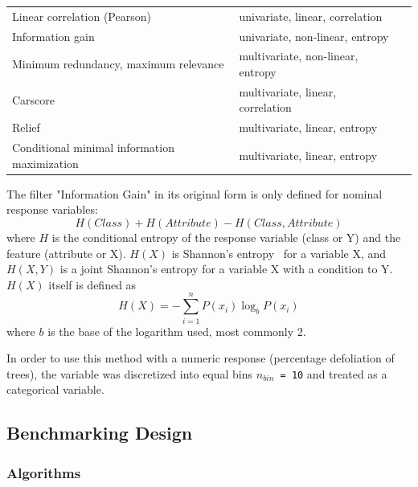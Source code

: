 \documentclass[remotesensing,article,accept,moreauthors,pdftex]{Definitions/mdpi}
\begin{document}
\begin{paracol}{2}
\begin{specialtable}[H]
\begin{tabular}{lll}
			Linear correlation (Pearson)                 & univariate, linear, correlation   &~\cite{pearson1901} \\
			Information gain                             & univariate, non-linear, entropy   &~\cite{quinlan1986} \\
			Minimum redundancy, maximum relevance        & multivariate, non-linear, entropy &~\cite{zhao2013}    \\
			Carscore                                     & multivariate, linear, correlation &~\cite{zuber2011}   \\
			Relief                                       & multivariate, linear, entropy     &~\cite{kira1992}    \\
			Conditional minimal information maximization & multivariate, linear, entropy     &~\cite{fleuret2004}\\\bottomrule
		\end{tabular}
	\endgroup
\end{specialtable}

The filter "Information Gain" in its original form is only defined for nominal response variables:
\begin{equation}
	H(Class) + H(Attribute) - H(Class, Attribute)
\end{equation}
where \(H\) is the conditional entropy of the response variable (class or Y) and the feature (attribute or X).
$H(X)$ is Shannon's entropy~\cite{shannon1948} for a variable X, and $H(X, Y)$ is a joint Shannon's entropy for a variable X with a condition to Y.
$H(X)$ itself is defined as
\begin{equation}
	H(X) = - \sum_{i=1}^{n} P(x_i)\log_bP(x_i)
\end{equation}
where $b$ is the base of the logarithm used, most commonly 2.

In order to use this method with a numeric response (percentage defoliation of trees), the variable was discretized into equal bins \texttt{\(n_{bin}\) = 10} and treated as a categorical variable.

\subsection{Benchmarking Design}

\subsubsection{Algorithms}


\end{paracol}
\end{document}

